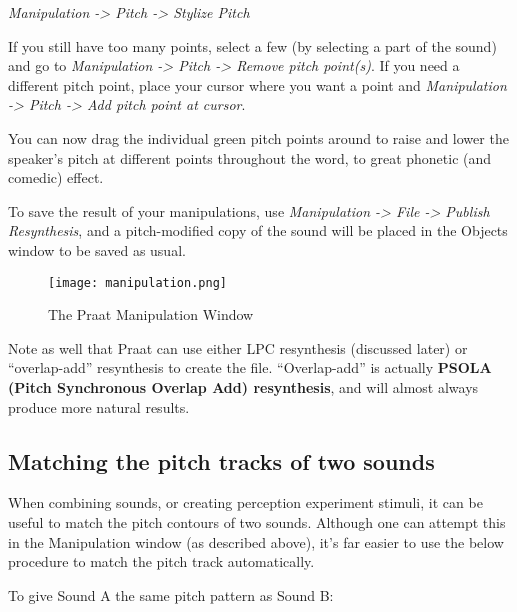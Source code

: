 \documentclass[11pt]{article}
\begin{document}
\emph{Manipulation -\textgreater{} Pitch -\textgreater{} Stylize Pitch}

If you still have too many points, select a few (by selecting a part of
the sound) and go to \emph{Manipulation -\textgreater{} Pitch
-\textgreater{} Remove pitch point(s)}. If you need a different pitch
point, place your cursor where you want a point and \emph{Manipulation
-\textgreater{} Pitch -\textgreater{} Add pitch point at cursor}.

You can now drag the individual green pitch points around to raise and
lower the speaker's pitch at different points throughout the word, to
great phonetic (and comedic) effect.

To save the result of your manipulations, use \emph{Manipulation
-\textgreater{} File -\textgreater{} Publish Resynthesis}, and a
pitch-modified copy of the sound will be placed in the Objects window to
be saved as usual.

\begin{figure}
  \centerline{
    \mbox{\texttt{[image: manipulation.png]}}
  }
  \caption{The Praat Manipulation Window\label{manipulation}}

  \end{figure}

Note as well that Praat can use either LPC resynthesis (discussed later)
or ``overlap-add'' resynthesis to create the file. ``Overlap-add'' is
actually \textbf{PSOLA (Pitch Synchronous Overlap Add) resynthesis}, and
will almost always produce more natural results.

\hypertarget{matching-the-pitch-tracks-of-two-sounds}{%
\subsection{Matching the pitch tracks of two
sounds}\label{matching-the-pitch-tracks-of-two-sounds}}

When combining sounds, or creating perception experiment stimuli, it can
be useful to match the pitch contours of two sounds. Although one can
attempt this in the Manipulation window (as described above), it's far
easier to use the below procedure to match the pitch track
automatically.

To give Sound A the same pitch pattern as Sound B:
\end{document}
